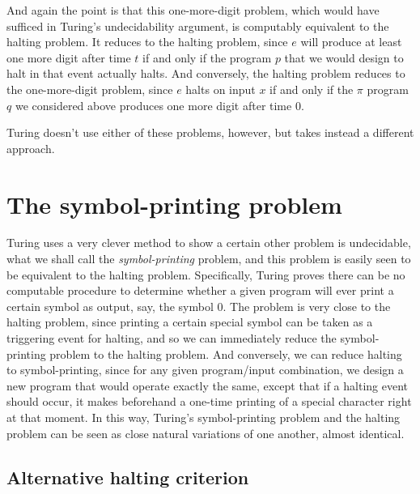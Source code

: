 \documentclass{amsart}
\begin{document}
And again the point is that this one-more-digit problem, which would have sufficed in Turing's undecidability argument, is computably equivalent to the halting problem. It reduces to the halting problem, since $e$ will produce at least one more digit after time $t$ if and only if the program $p$ that we would design to halt in that event actually halts. And conversely, the halting problem reduces to the one-more-digit problem, since $e$ halts on input $x$ if and only if the $\pi$ program $q$ we considered above produces one more digit after time $0$.

Turing doesn't use either of these problems, however, but takes instead a different approach.

\section{The symbol-printing problem}\label{Section.Symbol-printing}

Turing uses a very clever method to show a certain other problem is undecidable, what we shall call the \emph{symbol-printing} problem, and this problem is easily seen to be equivalent to the halting problem. Specifically, Turing proves there can be no computable procedure to determine whether a given program will ever print a certain symbol as output, say, the symbol $0$. The problem is very close to the halting problem, since printing a certain special symbol can be taken as a triggering event for halting, and so we can immediately reduce the symbol-printing problem to the halting problem. And conversely, we can reduce halting to symbol-printing, since for any given program/input combination, we design a new program that would operate exactly the same, except that if a halting event should occur, it makes beforehand a one-time printing of a special character right at that moment. In this way, Turing's symbol-printing problem and the halting problem can be seen as close natural variations of one another, almost identical.

\subsection{Alternative halting criterion}
\end{document}

